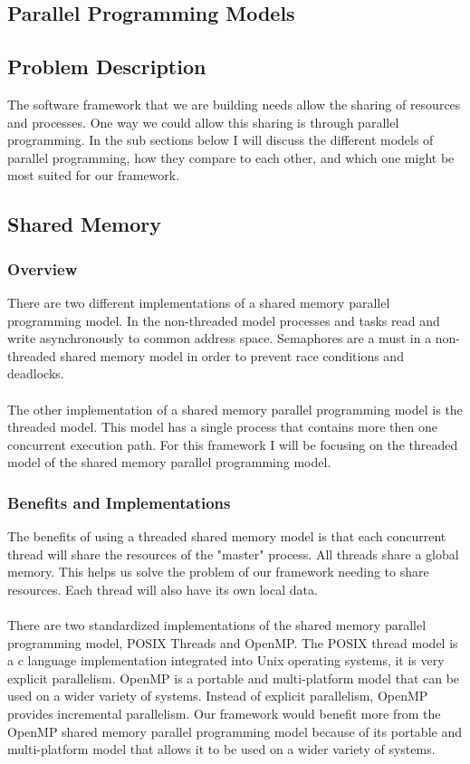 \subsection{Parallel Programming Models}
\subsection{Problem Description}
The software framework that we are building needs allow the sharing of resources and processes. One way we could allow this sharing is through parallel programming. In the sub sections below I will discuss the different models of parallel programming, how they compare to each other, and which one might be most suited for our framework.

\subsection{Shared Memory}
\subsubsection{Overview}
There are two different implementations of a shared memory parallel programming model. In the non-threaded model processes and tasks read and write asynchronously to common address space. Semaphores are a must in a non-threaded shared memory model in order to prevent race conditions and deadlocks. \cite{PP}
\\ \\
The other implementation of a shared memory parallel programming model is the threaded model. This model has a single process that contains more then one concurrent execution path. For this framework I will be focusing on the threaded model of the shared memory parallel programming model. \cite{PP}
\subsubsection{Benefits and Implementations}
The benefits of using a threaded shared memory model is that each concurrent thread will share the resources of the "master" process. All threads share a global memory. This helps us solve the problem of our framework needing to share resources. Each thread will also have its own local data. \cite{PP}
\\ \\
There are two standardized implementations of the shared memory parallel programming model, POSIX Threads and OpenMP. The POSIX thread model is a c language implementation integrated into Unix operating systems, it is very explicit parallelism. OpenMP is a portable and multi-platform model that can be used on a wider variety of systems. Instead of explicit parallelism, OpenMP provides incremental parallelism. Our framework would benefit more from the OpenMP shared memory parallel programming model because of its portable and multi-platform model that allows it to be used on a wider variety of systems. \cite{PP}

